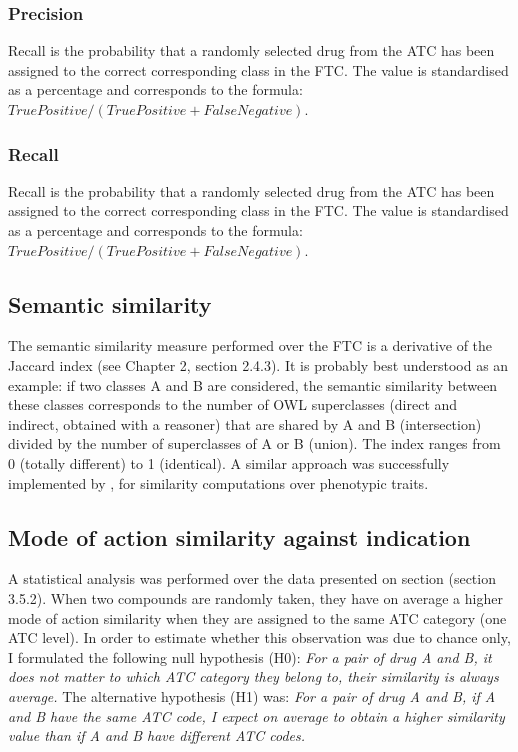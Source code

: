 \subsubsection{Precision}
Recall is the probability that a randomly selected drug from the ATC has been assigned to the correct corresponding class in the FTC. The value is standardised as a percentage and corresponds to the formula: $ True Positive / (True Positive + False Negative) $.

\subsubsection{Recall}
Recall is the probability that a randomly selected drug from the ATC has been assigned to the correct corresponding class in the FTC. The value is standardised as a percentage and corresponds to the formula: $ True Positive / (True Positive + False Negative) $.

\subsection{Semantic similarity}
The semantic similarity measure performed over the FTC is a derivative of the Jaccard index \citep{jaccard1912distribution} \citep{rogers1960computer} (see Chapter 2, section 2.4.3). It is probably best understood as an example: if two classes A and B are considered, the semantic similarity between these classes corresponds to the number of OWL superclasses (direct and indirect, obtained with a reasoner) that are shared by A and B (intersection) divided by the number of superclasses of A or B (union). The index ranges from 0 (totally different) to 1 (identical). A similar approach was successfully implemented by \citep{hoehndorf2011phenomenet}, for similarity computations over phenotypic traits.

\subsection{Mode of action similarity against indication}
A statistical analysis was performed over the data presented on section (section 3.5.2). When two compounds are randomly taken, they have on average a higher mode of action similarity when they are assigned to the same ATC category (one ATC level). In order to estimate whether this observation was due to chance only, I formulated the following null hypothesis (H0): \emph{For a pair of drug A and B, it does not matter to which ATC category they belong to, their similarity is always average.} The alternative hypothesis (H1) was: \emph{For a pair of drug A and B, if A and B have the same ATC code, I expect on average to obtain a higher similarity value than if A and B have different ATC codes.}

